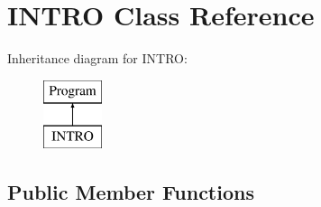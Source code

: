 \hypertarget{classINTRO}{\section{I\-N\-T\-R\-O Class Reference}
\label{classINTRO}
}
Inheritance diagram for I\-N\-T\-R\-O\-:\begin{figure}[H]
\begin{center}
\leavevmode
\includegraphics[height=2.000000cm]{classINTRO}
\end{center}
\end{figure}
\subsection*{Public Member Functions}
